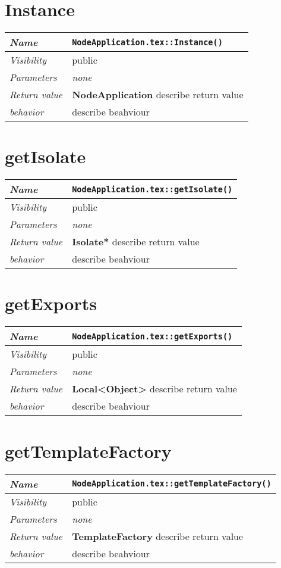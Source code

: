  \section{Instance}
\begin{longtable}{p{3cm} @{\hskip 1cm} p{12cm}}
 \hline
\textit{Name} & \texttt{NodeApplication.tex::Instance()}\\
\hline
 \textit{Visibility} & public\\
\hline
\textit{Parameters} & \textit{none}\\
\hline
\textit{Return value} & \textbf{ NodeApplication} describe return value\\
  \hline
 \textit{behavior} & describe beahviour \\
\hline
\end{longtable} \pagebreak
 \section{getIsolate}
\begin{longtable}{p{3cm} @{\hskip 1cm} p{12cm}}
 \hline
\textit{Name} & \texttt{NodeApplication.tex::getIsolate()}\\
\hline
 \textit{Visibility} & public\\
\hline
\textit{Parameters} & \textit{none}\\
\hline
\textit{Return value} & \textbf{ Isolate*} describe return value\\
  \hline
 \textit{behavior} & describe beahviour \\
\hline
\end{longtable} \pagebreak
 \section{getExports}
\begin{longtable}{p{3cm} @{\hskip 1cm} p{12cm}}
 \hline
\textit{Name} & \texttt{NodeApplication.tex::getExports()}\\
\hline
 \textit{Visibility} & public\\
\hline
\textit{Parameters} & \textit{none}\\
\hline
\textit{Return value} & \textbf{ Local<Object>} describe return value\\
  \hline
 \textit{behavior} & describe beahviour \\
\hline
\end{longtable} \pagebreak
 \section{getTemplateFactory}
\begin{longtable}{p{3cm} @{\hskip 1cm} p{12cm}}
 \hline
\textit{Name} & \texttt{NodeApplication.tex::getTemplateFactory()}\\
\hline
 \textit{Visibility} & public\\
\hline
\textit{Parameters} & \textit{none}\\
\hline
\textit{Return value} & \textbf{ TemplateFactory} describe return value\\
  \hline
 \textit{behavior} & describe beahviour \\
\hline
\end{longtable} \pagebreak
